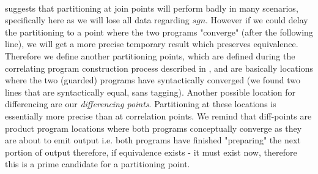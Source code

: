 \\
suggests that partitioning at join points will perform badly in many scenarios, specifically here as we will lose all data regarding $sgn$. However if we could delay the partitioning to a point where the two programs "converge" (after the following  line), we will get a more precise temporary result which preserves equivalence. Therefore we define another partitioning points, which are defined during the correlating program construction process described in , and are basically locations where the two (guarded) programs have syntactically converged (we found two lines that are syntactically equal, sans tagging). Another possible location for differencing are our \emph{differencing points}. Partitioning at these locations is essentially more precise than at correlation points. We remind that diff-points are product program locations where both programs conceptually converge as they are about to emit output i.e. both programs have finished "preparing" the next portion of output therefore, if equivalence exists - it must exist now, therefore this is a prime candidate for a partitioning point. %



